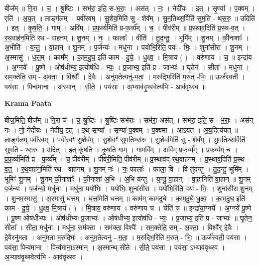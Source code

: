 \documentclass[17pt]{extarticle}
\begin{document}
बीज᳚म् ॥ गि॒रा । च॒ । श्रु॒ष्टिः । सभ॑रा॒ इति॒ स-भ॒राः॒ । अस॑त् । नः॒ । नेदी॑यः । इत् । सृ॒ण्या᳚ । प॒क्वम् । एति॑ । अ॒य॒त् ॥ लाङ्ग॑लम् । पवी॑रवम् । सु॒शेव॒मिति॑ सु - शेव᳚म् । सु॒म॒तिथ्स॒र्विति॑ सुम॒ति - थ्‌स॒रु॒ ॥ उदिति॑ । इत् । कृ॒ष॒ति॒ । गाम् । अवि᳚म् । प्र॒फ॒र्व्य॑मिति॑ प्र-फ॒र्व्य᳚म् । च॒ । पीव॑रीम् ॥ प्र॒स्थाव॒दिति॑ प्र॒स्थ-व॒त् । र॒थ॒वाह॑न॒मिति॑ रथ - वाह॑नम् ॥ शु॒नम् । नः॒ । फालाः᳚ । वीति॑ । तु॒द॒न्तु॒ । भूमि᳚म् । शु॒नम् । की॒नाशाः᳚ । अ॒भीति॑ । य॒न्तु॒ । वा॒हान् ॥ शु॒नम् । प॒र्जन्यः॑ । मधु॑ना । पयो॑भि॒रिति॒ पयः॑ - भिः॒ । शुना॑सीरा । शु॒नम् । अ॒स्मासु॑ । ध॒त्त॒म् ॥ काम᳚म् । का॒म॒दु॒घ॒ इति॑ काम - दु॒घे॒ । धु॒क्ष्व॒ । मि॒त्राय॑ ( ) । वरु॑णाय । च॒ ॥ इन्द्रा॑य । अ॒ग्नये᳚ । पू॒ष्णे । ओष॑धीभ्य॒ इत्योष॑धि - भ्यः॒ । प्र॒जाभ्य॒ इति॑ प्र - जाभ्यः॑ ॥ घृ॒तेन॑ । सीता᳚ । मधु॑ना । सम॒क्तेति॒ सम् - अ॒क्ता॒ । विश्वैः᳚ । दे॒वैः । अनु॑म॒तेत्यनु॑-म॒ता॒ । म॒रुद्भि॒रिति॑ म॒रुत् -भिः॒ ॥ ऊर्ज॑स्वती । पय॑सा । पिन्व॑माना । अ॒स्मान् । सी॒ते॒ । पय॑सा । अ॒भ्याव॑वृ॒थ्स्वेत्य॑भि - आव॑वृथ्स्व ॥  \newline


\textbf{Krama Paata} \newline

बीज॒मिति॒ बीज᳚म् ॥ गि॒रा च॑ । च॒ श्रु॒ष्टिः । श्रु॒ष्टिः सभ॑राः । सभ॑रा॒ अस॑त् । सभ॑रा॒ इति॒ स - भ॒राः॒ । अस॑न् नः । नो॒ नेदी॑यः । नेदी॑य॒ इत् । इथ् सृ॒ण्या᳚ । सृ॒ण्या॑ प॒क्वम् । प॒क्वमा । आऽय॑त् । अ॒य॒दित्य॑यत् ॥ लाङ्ग॑ल॒म् पवी॑रवम् । पवी॑रवꣳ सु॒शेव᳚म् । सु॒शेवꣳ॑ सुम॒तिथ्स॑रु । सु॒शेव॒मिति॑ सु - शेव᳚म् । सु॒म॒तिथ्स॒र्विति॑ सुम॒ति - थ्स॒रु॒ ॥ उदित् । इत् कृ॑षति । कृ॒ष॒ति॒ गाम् । गामवि᳚म् । अवि॑म् प्रफ॒र्व्य᳚म् । प्र॒फ॒र्व्य॑म् च । प्र॒फ॒र्व्य॑मिति॑ प्र - फ॒र्व्य᳚म् । च॒ पीव॑रीम् । पीव॑री॒मिति॒ पीव॑रीम् ॥ प्र॒स्थाव॑द् रथ॒वाह॑नम् । प्र॒स्थाव॒दिति॑ प्र॒स्थ - व॒त्॒ । र॒थ॒वाह॑न॒मिति॑ रथ - वाह॑नम् ॥ शु॒नम् नः॑ । नः॒ फालाः᳚ । फाला॒ वि । वि तु॑दन्तु । तु॒द॒न्तु॒ भूमि᳚म् । भूमिꣳ॑ शु॒नम् । शु॒नम् की॒नाशाः᳚ । की॒नाशा॑ अ॒भि । अ॒भि य॑न्तु । य॒न्तु॒ वा॒हान् । वा॒हानिति॑ वा॒हान् ॥ शु॒नम् प॒र्जन्यः॑ । प॒र्जन्यो॒ मधु॑ना । मधु॑ना॒ पयो॑भिः । पयो॑भिः॒ शुना॑सीरा । पयो॑भि॒रिति॒ पयः॑ - भिः॒ । शुना॑सीरा शु॒नम् । शु॒नम॒स्मासु॑ । अ॒स्मासु॑ धत्तम् । ध॒त्त॒मिति॑ धत्तम् ॥ काम॑म् कामदुघे । का॒म॒दु॒घे॒ धु॒क्ष्व॒ । का॒म॒दु॒घ॒ इति॑ काम - दु॒घे॒ । धु॒क्ष्व॒ मि॒त्राय॑ ( ) । मि॒त्राय॒ वरु॑णाय । वरु॑णाय च । चेति॑ च ॥ इन्द्रा॑या॒ग्नये᳚ । अ॒ग्नये॑ पू॒ष्णे । पू॒ष्ण ओष॑धीभ्यः । ओष॑धीभ्यः प्र॒जाभ्यः॑ । ओष॑धीभ्य॒ इत्योष॑धि - भ्यः॒ । प्र॒जाभ्य॒ इति॑ प्र - जाभ्यः॑ ॥ घृ॒तेन॒ सीता᳚ । सीता॒ मधु॑ना । मधु॑ना॒ सम॑क्ता । सम॑क्ता॒ विश्वैः᳚ । सम॒क्तेति॒ सम् - अ॒क्ता॒ । विश्वै᳚र् दे॒वैः । दे॒वैरनु॑मता । अनु॑मता म॒रुद्भिः॑ । अनु॑म॒तेत्यनु॑ - म॒ता॒ । म॒रुद्भि॒रिति॑ म॒रुत् - भिः॒ ॥ ऊर्ज॑स्वती॒ पय॑सा । पय॑सा॒ पिन्व॑माना । पिन्व॑माना॒ऽस्मान् । अ॒स्मान्थ् सी॑ते । सी॒ते॒ पय॑सा । पय॑सा॒ ऽभ्याव॑वृथ्स्व । अ॒भ्याव॑वृ॒थ्स्वेत्य॑भि - आव॑वृथ्स्व । \newline
\end{document}
